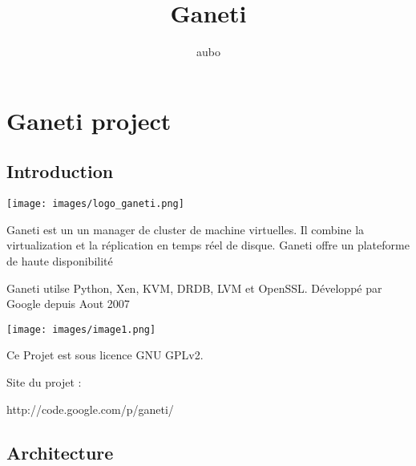 \documentclass[a4paper,10pt]{report}
\title{Ganeti}
\author{aubo}
\begin{document}
\maketitle
\chapter{Ganeti project}

\section{Introduction}
\texttt{[image: images/logo\_ganeti.png]}

Ganeti est un un manager de cluster de machine virtuelles. Il combine la virtualization et la réplication en temps réel de disque.
Ganeti offre un plateforme de haute disponibilité

Ganeti utilse Python, Xen, KVM, DRDB, LVM et OpenSSL.
Développé par Google depuis Aout 2007

\texttt{[image: images/image1.png]}

Ce Projet est sous licence GNU GPLv2.

Site du projet :

http://code.google.com/p/ganeti/


\section{Architecture}
\end{document}
